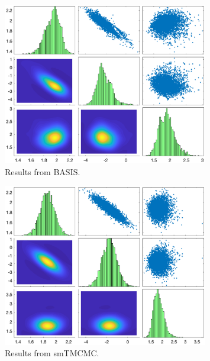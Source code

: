 \documentclass{article}
\begin{document}
\begin{figure}[p]
	\centering
	\includegraphics[width=0.8\textwidth]{figures/basis.eps}
	\caption{Results from BASIS.}
	\label{fig:basis}
\end{figure}


\begin{figure}[p]
	\centering
	\includegraphics[width=0.8\textwidth]{figures/smtmcmc.eps}
	\caption{Results from smTMCMC.}
	\label{fig:smtmcmc}
\end{figure}
\end{document}
